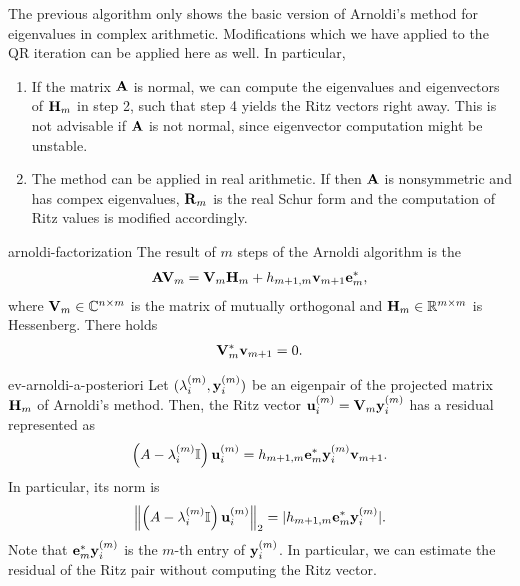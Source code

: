 \begin{remark}
  The previous algorithm only shows the basic version of Arnoldi's
  method for eigenvalues in complex arithmetic. Modifications which we
  have applied to the QR iteration can be applied here as well. In
  particular,
  \begin{enumerate}
  \item If the matrix $\mata$ is normal, we can compute the
    eigenvalues and eigenvectors of $\matH_m$ in step 2, such that
    step 4 yields the Ritz vectors right away. This is not advisable
    if $\mata$ is not normal, since eigenvector computation might be
    unstable.
  \item The method can be applied in real arithmetic. If then $\mata$
    is nonsymmetric and has compex eigenvalues, $\matr_m$ is the real
    Schur form and the computation of Ritz values is modified
    accordingly.
  \end{enumerate}
\end{remark}

\begin{Definition}{arnoldi-factorization}
  The result of $m$ steps of the Arnoldi algorithm is the
  \begin{gather*}
    \label{eq:ev-arnoldi-projection}
    \mata\matv_m = \matv_m\matH_m + h_{m+1,m}\vv_{m+1}\ve_m^*,
  \end{gather*}
  where $\matv_m\in\C^{n\times m}$ is the matrix of mutually
  orthogonal  and $\matH_m\in\R^{m\times m}$
  is Hessenberg. There holds
  \begin{gather}
    \matv_m^*\vv_{m+1} = 0.
  \end{gather}
\end{Definition}

\begin{Lemma}{ev-arnoldi-a-posteriori}
  Let $(\lambda_i^{(m)},\vy_i^{(m)})$ be an eigenpair of the projected
  matrix $\matH_m$ of Arnoldi's method. Then, the Ritz vector
  $\vu_i^{(m)} = \matv_m \vy_i^{(m)}$ has a residual represented as
  \begin{gather}
    \left(A-\lambda_i^{(m)}\identity\right)\vu_i^{(m)}
    = h_{m+1,m}\ve_m^*\vy_i^{(m)}\vv_{m+1}.
  \end{gather}
  In particular, its norm is
  \begin{gather}
    \norm*{\left(A-\lambda_i^{(m)}\identity\right)\vu_i^{(m)}}_2
    =  \abs{h_{m+1,m}\ve_m^*\vy_i^{(m)}}.
  \end{gather}
  Note that $\ve_m^*\vy_i^{(m)}$ is the $m$-th entry of
  $\vy_i^{(m)}$. In particular, we can estimate the residual of the
  Ritz pair without computing the Ritz vector.
\end{Lemma}

